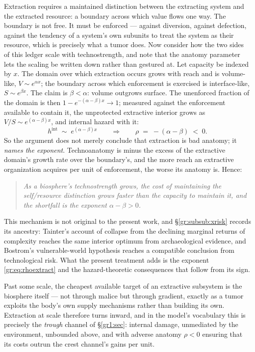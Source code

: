 \documentclass[11pt]{article}
\numberwithin{equation}{section}
\theoremstyle{plain}
\theoremstyle{definition}
\theoremstyle{remark}
\begin{document}
Extraction requires a maintained distinction between the extracting
system and the extracted resource: a boundary across which value flows
one way. The boundary is not free. It must be enforced --- against
diversion, against defection, against the tendency of a system's own
subunits to treat the system as their resource, which is precisely what
a tumor does. Now consider how the two sides of this ledger scale with technostrength,
and note that the anatomy parameter lets the scaling be written down
rather than gestured at. Let capacity be indexed by $x$. The domain over
which extraction occurs grows with reach and is volume-like,
$V\sim e^{\alpha x}$; the boundary across which enforcement is exercised
is interface-like, $S\sim e^{\beta x}$. The claim is
$\beta<\alpha$: volume outgrows surface. The unenforced fraction of the
domain is then $1-e^{-(\alpha-\beta)x}\to1$; measured against the
enforcement available to contain it, the unprotected extractive
interior grows as $V/S\sim e^{(\alpha-\beta)x}$, and internal hazard
with it:
\begin{equation}\label{gr:eq:rhoextract}
h^{\mathrm{int}}\;\sim\;e^{(\alpha-\beta)x}
\qquad\Longrightarrow\qquad
\rho\;=\;-(\alpha-\beta)\;<\;0 .
\end{equation}
So the argument does not merely conclude that extraction is bad
anatomy; it \emph{names the exponent}. Technoanatomy is minus the excess
of the extractive domain's growth rate over the boundary's, and the more
reach an extractive organization acquires per unit of enforcement, the
worse its anatomy is. Hence:

\begin{quote}
\emph{As a biosphere's technostrength grows, the cost of maintaining the
self/resource distinction grows faster than the capacity to maintain
it, and the shortfall is the exponent $\alpha-\beta>0$.}
\end{quote}

\noindent This mechanism is not original to the present work, and
\S\ref{gr:subsub:xrisk} records its ancestry: Tainter's account of
collapse from the declining marginal returns of complexity
\cite{Tainter88} reaches the same interior optimum from archaeological
evidence, and Bostrom's vulnerable-world hypothesis \cite{Bostrom19}
reaches a compatible conclusion from technological risk. What the
present treatment adds is the exponent \eqref{gr:eq:rhoextract} and the
hazard-theoretic consequences that follow from its sign.

Past some scale, the cheapest available target of an extractive
subsystem is the biosphere itself --- not through malice but through
gradient, exactly as a tumor exploits the body's own supply mechanisms
rather than building its own. Extraction at scale therefore turns
inward, and in the model's vocabulary this is precisely the
\emph{trough} channel of \S\ref{gr1:sec}: internal damage, unmediated by the
environment, unbounded above, and with adverse anatomy $\rho<0$ ensuring
that its costs outrun the crest channel's gains per unit.
\end{document}
